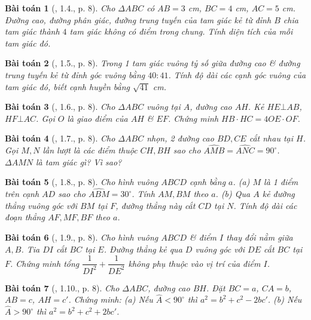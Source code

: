 \documentclass{article}
\newtheorem{baitoan}{Bài toán}
\begin{document}
\begin{baitoan}[\cite{TLCT_THCS_Toan_9_hinh_hoc}, 1.4., p. 8]
	Cho $\Delta ABC$ có $AB = 3$  {\rm cm}, $BC = 4$ {\rm cm}, $AC = 5$ {\rm cm}. Đường cao, đường phân giác, đường trung tuyến của tam giác kẻ từ đỉnh $B$ chia tam giác thành $4$ tam giác không có điểm trong chung. Tính diện tích của mỗi tam giác đó.
\end{baitoan}

\begin{baitoan}[\cite{TLCT_THCS_Toan_9_hinh_hoc}, 1.5., p. 8]
	Trong 1 tam giác vuông tỷ số giữa đường cao \& đường trung tuyến kẻ từ đỉnh góc vuông bằng $40:41$. Tính độ dài các cạnh góc vuông của tam giác đó, biết cạnh huyền bằng $\sqrt{41}$ {\rm cm}.
\end{baitoan}

\begin{baitoan}[\cite{TLCT_THCS_Toan_9_hinh_hoc}, 1.6., p. 8]
	Cho $\Delta ABC$ vuông tại $A$, đường cao $AH$. Kẻ $HE\bot AB$, $HF\bot AC$. Gọi $O$ là giao điểm của $AH$ \& $EF$. Chứng minh $HB\cdot HC = 4OE\cdot OF$.
\end{baitoan}

\begin{baitoan}[\cite{TLCT_THCS_Toan_9_hinh_hoc}, 1.7., p. 8]
	Cho $\Delta ABC$ nhọn, 2 đường cao $BD,CE$ cắt nhau tại $H$. Gọi $M,N$ lần lượt là các điểm thuộc $CH,BH$ sao cho $\widehat{AMB} = \widehat{ANC} = 90^\circ$. $\Delta AMN$ là tam giác gì? Vì sao?
\end{baitoan}

\begin{baitoan}[\cite{TLCT_THCS_Toan_9_hinh_hoc}, 1.8., p. 8]
	Cho hình vuông $ABCD$ cạnh bằng $a$. (a) $M$ là 1 điểm trên cạnh $AD$ sao cho $\widehat{ABM} = 30^\circ$. Tính $AM,BM$ theo $a$. (b) Qua $A$ kẻ đường thẳng vuông góc với $BM$ tại $F$, đường thẳng này cắt $CD$ tại $N$. Tính độ dài các đoạn thẳng $AF,MF,BF$ theo $a$.
\end{baitoan}

\begin{baitoan}[\cite{TLCT_THCS_Toan_9_hinh_hoc}, 1.9., p. 8]
	Cho hình vuông $ABCD$ \& điểm $I$ thay đổi nằm giữa $A,B$. Tia $DI$ cắt $BC$ tại $E$. Đường thẳng kẻ qua $D$ vuông góc với $DE$ cắt $BC$ tại $F$. Chứng minh tổng $\dfrac{1}{DI^2} + \dfrac{1}{DE^2}$ không phụ thuộc vào vị trí của điểm $I$.
\end{baitoan}

\begin{baitoan}[\cite{TLCT_THCS_Toan_9_hinh_hoc}, 1.10., p. 8]
	Cho $\Delta ABC$, đường cao $BH$. Đặt $BC = a$, $CA = b$, $AB = c$, $AH = c'$. Chứng minh: (a) Nếu $\widehat{A} < 90^\circ$ thì $a^2 = b^2 + c^2 - 2bc'$. (b) Nếu $\widehat{A} > 90^\circ$ thì $a^2 = b^2 + c^2 + 2bc'$.
\end{baitoan}
\end{document}
